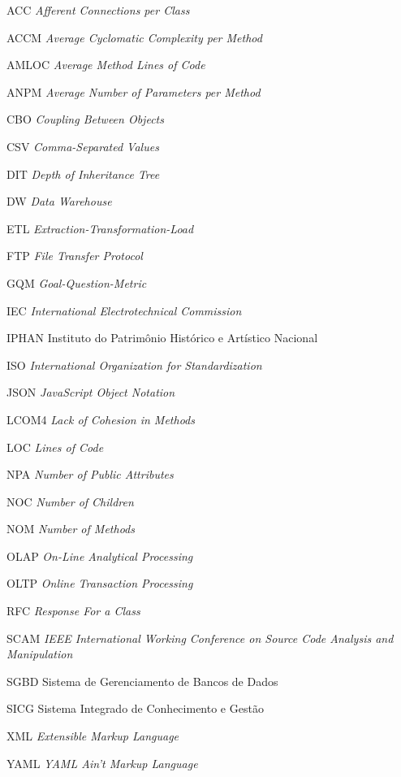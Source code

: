 \begin{siglas}
\item [ACC]   \textit{Afferent Connections per Class}
\item [ACCM]  \textit{Average Cyclomatic Complexity per Method}
\item [AMLOC] \textit{Average Method Lines of Code}
\item [ANPM]  \textit{Average Number of Parameters per Method}
\item [CBO]   \textit{Coupling Between Objects}
\item [CSV]   \textit{Comma-Separated Values}
\item [DIT]	  \textit{Depth of Inheritance Tree}
\item [DW]	  \textit{Data Warehouse}
\item [ETL]   \textit{Extraction-Transformation-Load}
\item [FTP]   \textit{File Transfer Protocol}
\item [GQM]   \textit{Goal-Question-Metric}
\item [IEC]   \textit{International Electrotechnical Commission}
\item [IPHAN] Instituto do Patrimônio Histórico e Artístico Nacional
\item [ISO]   \textit{International Organization for Standardization}
\item [JSON]   \textit{JavaScript Object Notation}
\item [LCOM4] \textit{Lack of Cohesion in Methods}
\item [LOC]   \textit{Lines of Code}
\item [NPA]   \textit{Number of Public Attributes}
\item [NOC]   \textit{Number of Children}
\item [NOM]   \textit{Number of Methods}
\item [OLAP]  \textit{On-Line Analytical Processing}
\item [OLTP]  \textit{Online Transaction Processing}
\item [RFC]   \textit{Response For a Class}
\item [SCAM]  \textit{IEEE International Working Conference on Source Code Analysis and Manipulation}
\item [SGBD]  Sistema de Gerenciamento de Bancos de Dados
\item [SICG]  Sistema Integrado de Conhecimento e Gestão
\item [XML]    \textit{Extensible Markup Language}
\item [YAML]   \textit{YAML Ain't Markup Language}  
\end{siglas}
